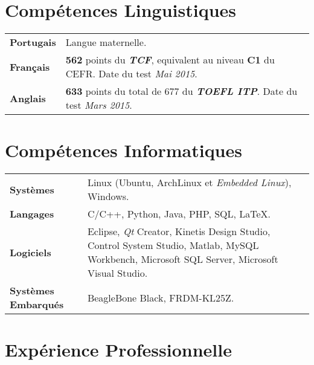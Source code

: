 \documentclass[10pt, a4paper]{article}
\begin{document}



\section{Compétences Linguistiques}

\begin{tabular}{p{} p{}}

\textbf{Portugais} & Langue maternelle.  \\ 

\textbf{Français} & \textbf{562} points du \textbf{\textit{TCF}},
equivalent au niveau \textbf{C1} du CEFR. Date du test \textit{Mai
2015}.\\

\textbf{Anglais} & \textbf{633} points du total de 677 du \textbf{\textit{TOEFL
ITP}}. Date du test \textit{Mars 2015}. \\  

\end{tabular}


\section{Compétences Informatiques} 

\begin{tabular}{p{} p{}}

 \textbf{Systèmes} & Linux (Ubuntu, ArchLinux et \textit{Embedded Linux}),
 Windows.  \\

 \textbf{Langages} & C/C++, Python, Java, PHP,  SQL, \LaTeX. \\ 
 
 \textbf{Logiciels} & Eclipse, \textit{Qt} Creator, Kinetis Design Studio,
 Control System Studio, Matlab, MySQL Workbench, Microsoft SQL Server, Microsoft
 Visual Studio. \\
 
  \textbf{Systèmes \newline Embarqués} & BeagleBone Black, FRDM-KL25Z. \\
\end{tabular}


\section{Expérience Professionnelle}
\end{document}
